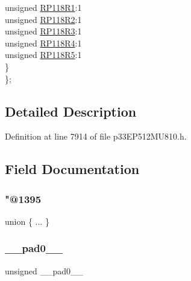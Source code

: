 \begin{DoxyCompactItemize}
\begin{tabbing}
\>\>unsigned \hyperlink{structtag_r_p_o_r13_b_i_t_s_af27295d7a92717e1c2f8053e269251c0}{RP118R1}:1\\
\>\>unsigned \hyperlink{structtag_r_p_o_r13_b_i_t_s_a909d876ba671503c469906e938f5401c}{RP118R2}:1\\
\>\>unsigned \hyperlink{structtag_r_p_o_r13_b_i_t_s_a5416b23811d36e807551b2ec3318d965}{RP118R3}:1\\
\>\>unsigned \hyperlink{structtag_r_p_o_r13_b_i_t_s_a922632ab1666b5a3324ce7a18fc4f842}{RP118R4}:1\\
\>\>unsigned \hyperlink{structtag_r_p_o_r13_b_i_t_s_a9c1687d985da6bd95f9febe7d6bdc160}{RP118R5}:1\\
\>\} \\
\}; \\

\end{tabbing}\end{DoxyCompactItemize}


\subsection{Detailed Description}


Definition at line 7914 of file p33\+E\+P512\+M\+U810.\+h.



\subsection{Field Documentation}
\mbox{\label{structtag_r_p_o_r13_b_i_t_s_a2e9b4a62b1452c8462f28a7c2d12b8a9}} 
\subsubsection{\texorpdfstring{"@1395}{@1395}}
{\footnotesize\ttfamily union \{ ... \} }

\mbox{\label{structtag_r_p_o_r13_b_i_t_s_adf71f3d8410c1f1dbbc96680a92c49af}} 
\subsubsection{\texorpdfstring{\+\_\+\+\_\+pad0\+\_\+\+\_\+}{\_\_pad0\_\_}}
{\footnotesize\ttfamily unsigned \+\_\+\+\_\+pad0\+\_\+\+\_\+}




